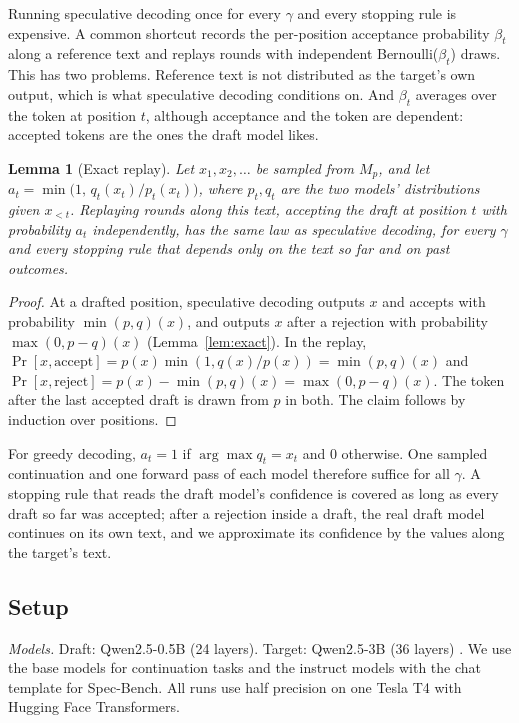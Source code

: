 \documentclass[10pt]{article}
\newtheorem{lemma}{Lemma}
\theoremstyle{remark}
\begin{document}
Running speculative decoding once for every $\gamma$ and every stopping rule is expensive. A common shortcut records
the per-position acceptance probability $\beta_t$ along a reference text and replays rounds with independent
Bernoulli($\beta_t$) draws. This has two problems. Reference text is not distributed as the target's own output,
which is what speculative decoding conditions on. And $\beta_t$ averages over the token at position $t$, although
acceptance and the token are dependent: accepted tokens are the ones the draft model likes.

\begin{lemma}[Exact replay]\label{lem:replay}
Let $x_1,x_2,\dots$ be sampled from $M_p$, and let $a_t=\min\!\big(1,\,q_t(x_t)/p_t(x_t)\big)$, where $p_t,q_t$ are
the two models' distributions given $x_{<t}$. Replaying rounds along this text, accepting the draft at position $t$
with probability $a_t$ independently, has the same law as speculative decoding, for every $\gamma$ and every
stopping rule that depends only on the text so far and on past outcomes.
\end{lemma}
\begin{proof}
At a drafted position, speculative decoding outputs $x$ and accepts with probability $\min(p,q)(x)$, and outputs
$x$ after a rejection with probability $\max(0,p-q)(x)$ (Lemma~\ref{lem:exact}). In the replay,
$\Pr[x,\text{accept}]=p(x)\min(1,q(x)/p(x))=\min(p,q)(x)$ and
$\Pr[x,\text{reject}]=p(x)-\min(p,q)(x)=\max(0,p-q)(x)$. The token after the last accepted draft is drawn from $p$
in both. The claim follows by induction over positions.
\end{proof}
\noindent For greedy decoding, $a_t=1$ if $\arg\max q_t=x_t$ and $0$ otherwise. One sampled continuation and one
forward pass of each model therefore suffice for all $\gamma$. A stopping rule that reads the draft model's
confidence is covered as long as every draft so far was accepted; after a rejection inside a draft, the real draft
model continues on its own text, and we approximate its confidence by the values along the target's text.

\subsection{Setup}

\emph{Models.} Draft: Qwen2.5-0.5B (24 layers). Target: Qwen2.5-3B (36 layers) \cite{qwen}. We use the base models
for continuation tasks and the instruct models with the chat template for Spec-Bench. All runs use half precision
on one Tesla T4 with Hugging Face Transformers.
\end{document}
